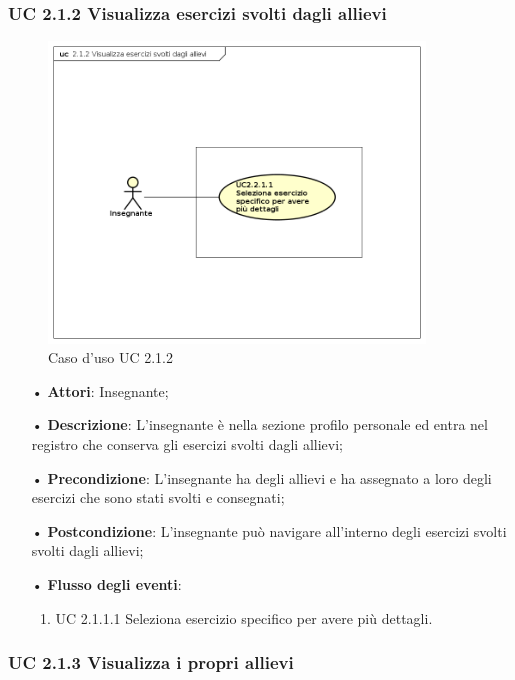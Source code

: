 \subsubsection{UC 2.1.2  Visualizza esercizi svolti dagli allievi}
\begin{figure}[H]
\centering
\includegraphics[width=10cm]{img/UC212.png} 
\caption{Caso d'uso UC 2.1.2}
\end{figure}
\begin{itemize}
	\item[•] \textbf{Attori}: Insegnante;
	\item[•] \textbf{Descrizione}:  L’insegnante è nella sezione profilo personale ed entra
		nel registro che conserva gli esercizi svolti dagli allievi;
	\item[•] \textbf{Precondizione}:  L’insegnante ha degli allievi e ha assegnato a loro degli esercizi che sono stati svolti e consegnati;

	\item[•] \textbf{Postcondizione}: L’insegnante può navigare all’interno degli esercizi svolti 
                       svolti dagli allievi; 

	\item[•] \textbf{Flusso degli eventi}:
		\begin{enumerate}
			\item UC 2.1.1.1  Seleziona esercizio specifico per avere più dettagli.	
		\end{enumerate}
\end{itemize}
\subsubsection{UC 2.1.3 Visualizza i propri allievi}

